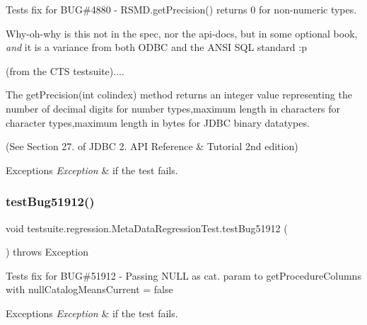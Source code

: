 Tests fix for B\+UG\#4880 -\/ R\+S\+M\+D.\+get\+Precision() returns \textquotesingle{}0\textquotesingle{} for non-\/numeric types.

Why-\/oh-\/why is this not in the spec, nor the api-\/docs, but in some \textquotesingle{}optional\textquotesingle{} book, {\itshape and} it is a variance from both O\+D\+BC and the A\+N\+SI S\+QL standard \+:p

(from the C\+TS testsuite)....

The get\+Precision(int colindex) method returns an integer value representing the number of decimal digits for number types,maximum length in characters for character types,maximum length in bytes for J\+D\+BC binary datatypes.

(See Section 27. of J\+D\+BC 2. A\+PI Reference \& Tutorial 2nd edition)


\begin{DoxyExceptions}{Exceptions}
{\em Exception} & if the test fails. \\
\hline
\end{DoxyExceptions}
\mbox{\label{classtestsuite_1_1regression_1_1_meta_data_regression_test_a38cf409b423124090866e96e64226104}} 
\subsubsection{\texorpdfstring{test\+Bug51912()}{testBug51912()}}
{\footnotesize\ttfamily void testsuite.\+regression.\+Meta\+Data\+Regression\+Test.\+test\+Bug51912 (\begin{DoxyParamCaption}{ }\end{DoxyParamCaption}) throws Exception}

Tests fix for B\+UG\#51912 -\/ Passing N\+U\+LL as cat. param to get\+Procedure\+Columns with null\+Catalog\+Means\+Current = false


\begin{DoxyExceptions}{Exceptions}
{\em Exception} & if the test fails. \\
\hline
\end{DoxyExceptions}
\mbox{\label{classtestsuite_1_1regression_1_1_meta_data_regression_test_a9fe48a9548719aa95df0a85252333e6c}} 
